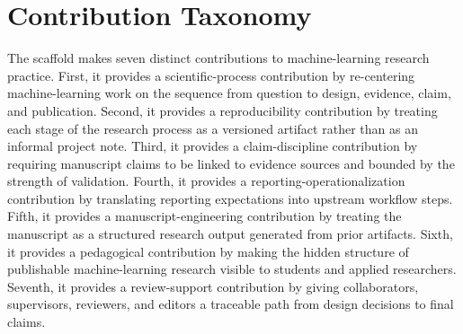\section{Contribution Taxonomy}

The scaffold makes seven distinct contributions to machine-learning research practice. First, it provides a scientific-process contribution by re-centering machine-learning work on the sequence from question to design, evidence, claim, and publication. Second, it provides a reproducibility contribution by treating each stage of the research process as a versioned artifact rather than as an informal project note. Third, it provides a claim-discipline contribution by requiring manuscript claims to be linked to evidence sources and bounded by the strength of validation. Fourth, it provides a reporting-operationalization contribution by translating reporting expectations into upstream workflow steps. Fifth, it provides a manuscript-engineering contribution by treating the manuscript as a structured research output generated from prior artifacts. Sixth, it provides a pedagogical contribution by making the hidden structure of publishable machine-learning research visible to students and applied researchers. Seventh, it provides a review-support contribution by giving collaborators, supervisors, reviewers, and editors a traceable path from design decisions to final claims.

